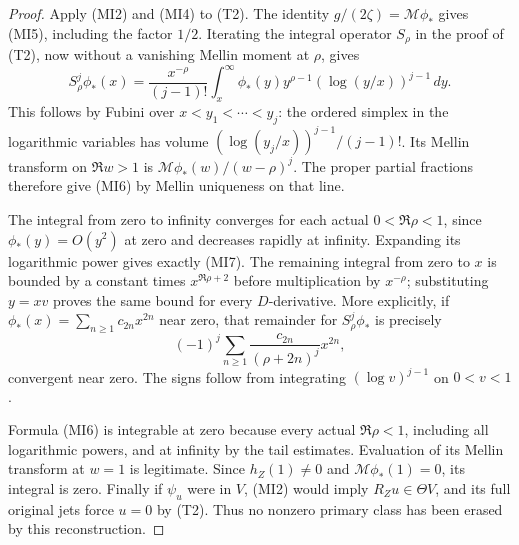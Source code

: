 \documentclass[11pt]{article}
\begin{document}
\begin{proof}
Apply (MI2) and (MI4) to (T2). The identity
$g/(2\zeta)=\mathcal M\phi_*$ gives (MI5), including the factor
$1/2$. Iterating the integral operator $S_\rho$ in the proof of
(T2), now without a vanishing Mellin moment at $\rho$, gives
\[
 S_\rho^j\phi_*(x)=\frac{x^{-\rho}}{(j-1)!}
       \int_x^\infty\phi_*(y)y^{\rho-1}
                      (\log(y/x))^{j-1}\,dy.
\]
This follows by Fubini over $x<y_1<\cdots<y_j$: the ordered
simplex in the logarithmic variables has volume
$(\log(y_j/x))^{j-1}/(j-1)!$. Its Mellin transform on
$\Re w>1$ is $\mathcal M\phi_*(w)/(w-\rho)^j$.
The proper partial fractions therefore give (MI6) by Mellin
uniqueness on that line.

The integral from zero to infinity converges for each actual
$0<\Re\rho<1$, since $\phi_*(y)=O(y^2)$ at zero and decreases
rapidly at infinity. Expanding its logarithmic power gives exactly
(MI7). The remaining integral from zero to $x$ is bounded by a
constant times $x^{\Re\rho+2}$ before multiplication by
$x^{-\rho}$; substituting $y=xv$ proves the same bound for every
$D$-derivative. More explicitly, if
$\phi_*(x)=\sum_{n\geq1}c_{2n}x^{2n}$ near zero, that remainder
for $S_\rho^j\phi_*$ is precisely
\[
 (-1)^j\sum_{n\geq1}\frac{c_{2n}}{(\rho+2n)^j}x^{2n},
\]
convergent near zero. The signs follow from integrating
$(\log v)^{j-1}$ on $0<v<1$.

Formula (MI6) is integrable at zero because every actual
$\Re\rho<1$, including all logarithmic powers, and at infinity
by the tail estimates. Evaluation of its Mellin transform at $w=1$
is legitimate. Since $h_Z(1)\ne0$ and
$\mathcal M\phi_*(1)=0$, its integral is zero. Finally if
$\psi_u$ were in $V$, (MI2) would imply $R_Zu\in\Theta V$,
and its full original jets force $u=0$ by (T2). Thus no nonzero
primary class has been erased by this reconstruction.
\end{proof}
\end{document}
